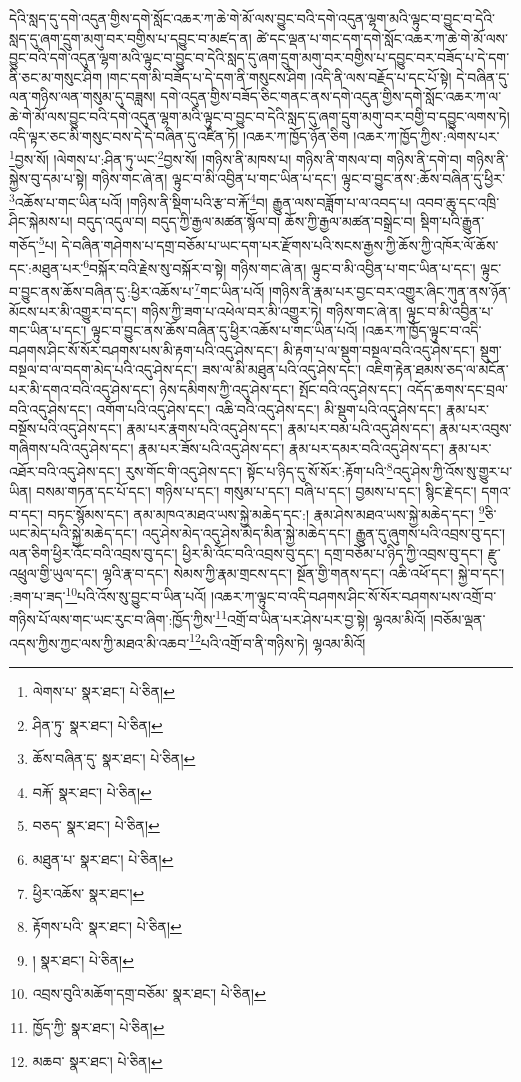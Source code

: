 དེའི་སླད་དུ་དགེ་འདུན་གྱིས་དགེ་སློང་འཆར་ཀ་ཆེ་གེ་མོ་ལས་བྱུང་བའི་དགེ་འདུན་ལྷག་མའི་ལྟུང་བ་བྱུང་བ་དེའི་སླད་དུ་ཞག་དྲུག་མགུ་བར་བགྱིས་པ་དབྱུང་བ་མཛད་ན། ཚེ་དང་ལྡན་པ་གང་དག་དགེ་སློང་འཆར་ཀ་ཆེ་གེ་མོ་ལས་བྱུང་བའི་དགེ་འདུན་ལྷག་མའི་ལྟུང་བ་བྱུང་བ་དེའི་སླད་དུ་ཞག་དྲུག་མགུ་བར་བགྱིས་པ་དབྱུང་བར་བཟོད་པ་དེ་དག་ནི་ཅང་མ་གསུང་ཤིག །གང་དག་མི་བཟོད་པ་དེ་དག་ནི་གསུངས་ཤིག །འདི་ནི་ལས་བརྗོད་པ་དང་པོ་སྟེ། དེ་བཞིན་དུ་ལན་གཉིས་ལན་གསུམ་དུ་བཟླས། དགེ་འདུན་གྱིས་བཟོད་ཅིང་གནང་ནས་དགེ་འདུན་གྱིས་དགེ་སློང་འཆར་ཀ་ལ་ཆེ་གེ་མོ་ལས་བྱུང་བའི་དགེ་འདུན་ལྷག་མའི་ལྟུང་བ་བྱུང་བ་དེའི་སླད་དུ་ཞག་དྲུག་མགུ་བར་བགྱི་བ་དབྱུང་ལགས་ཏེ། འདི་ལྟར་ཅང་མི་གསུང་བས་དེ་དེ་བཞིན་དུ་འཛིན་ཏོ། །འཆར་ཀ་ཁྱོད་ཉོན་ཅིག །འཆར་ཀ་ཁྱོད་ཀྱིས་:ལེགས་པར་\footnote{ལེགས་པ་  སྣར་ཐང་།  པེ་ཅིན། }བྱས་སོ། །ལེགས་པ་:ཤིན་ཏུ་ཡང་\footnote{ཤིན་ཏུ་  སྣར་ཐང་།  པེ་ཅིན། }བྱས་སོ། །གཉིས་ནི་མཁས་པ། གཉིས་ནི་གསལ་བ། གཉིས་ནི་དགེ་བ། གཉིས་ནི་སྐྱེས་བུ་དམ་པ་སྟེ། གཉིས་གང་ཞེ་ན། ལྟུང་བ་མི་འབྱིན་པ་གང་ཡིན་པ་དང་། ལྟུང་བ་བྱུང་ནས་:ཆོས་བཞིན་དུ་ཕྱིར་\footnote{ཆོས་བཞིན་དུ་  སྣར་ཐང་།  པེ་ཅིན། }འཆོས་པ་གང་ཡིན་པའོ། །གཉིས་ནི་སྡིག་པའི་རྩ་བ་རྐོ་\footnote{བརྐོ་  སྣར་ཐང་།  པེ་ཅིན། }བ། རྒྱུན་ལས་བཟློག་པ་ལ་འབད་པ། འབབ་ཆུ་དང་འཁྲི་ཤིང་སྐེམས་པ། བདུད་འདུལ་བ། བདུད་ཀྱི་རྒྱལ་མཚན་སྙོལ་བ། ཆོས་ཀྱི་རྒྱལ་མཚན་བསྒྲེང་བ། སྡིག་པའི་རྒྱུན་གཅོད་\footnote{བཅད་  སྣར་ཐང་།  པེ་ཅིན། }པ། དེ་བཞིན་གཤེགས་པ་དགྲ་བཅོམ་པ་ཡང་དག་པར་རྫོགས་པའི་སངས་རྒྱས་ཀྱི་ཆོས་ཀྱི་འཁོར་ལོ་ཆོས་དང་:མཐུན་པར་\footnote{མཐུན་པ་  སྣར་ཐང་།  པེ་ཅིན། }བསྐོར་བའི་རྗེས་སུ་བསྐོར་བ་སྟེ། གཉིས་གང་ཞེ་ན། ལྟུང་བ་མི་འབྱིན་པ་གང་ཡིན་པ་དང་། ལྟུང་བ་བྱུང་ནས་ཆོས་བཞིན་དུ་:ཕྱིར་འཆོས་པ་\footnote{ཕྱིར་འཆོས་  སྣར་ཐང་། }གང་ཡིན་པའོ། །གཉིས་ནི་རྣམ་པར་བྱང་བར་འགྱུར་ཞིང་ཀུན་ནས་ཉོན་མོངས་པར་མི་འགྱུར་བ་དང་། གཉིས་ཀྱི་ཟག་པ་འཕེལ་བར་མི་འགྱུར་ཏེ། གཉིས་གང་ཞེ་ན། ལྟུང་བ་མི་འབྱིན་པ་གང་ཡིན་པ་དང་། ལྟུང་བ་བྱུང་ནས་ཆོས་བཞིན་དུ་ཕྱིར་འཆོས་པ་གང་ཡིན་པའོ། །འཆར་ཀ་ཁྱོད་ལྟུང་བ་འདི་བཤགས་ཤིང་སོ་སོར་བཤགས་པས་མི་རྟག་པའི་འདུ་ཤེས་དང་། མི་རྟག་པ་ལ་སྡུག་བསྔལ་བའི་འདུ་ཤེས་དང་། སྡུག་བསྔལ་བ་ལ་བདག་མེད་པའི་འདུ་ཤེས་དང་། ཟས་ལ་མི་མཐུན་པའི་འདུ་ཤེས་དང་། འཇིག་རྟེན་ཐམས་ཅད་ལ་མངོན་པར་མི་དགའ་བའི་འདུ་ཤེས་དང་། ཉེས་དམིགས་ཀྱི་འདུ་ཤེས་དང་། སྤོང་བའི་འདུ་ཤེས་དང་། འདོད་ཆགས་དང་བྲལ་བའི་འདུ་ཤེས་དང་། འགོག་པའི་འདུ་ཤེས་དང་། འཆི་བའི་འདུ་ཤེས་དང་། མི་སྡུག་པའི་འདུ་ཤེས་དང་། རྣམ་པར་བསྔོས་པའི་འདུ་ཤེས་དང་། རྣམ་པར་རྣགས་པའི་འདུ་ཤེས་དང་། རྣམ་པར་བམ་པའི་འདུ་ཤེས་དང་། རྣམ་པར་འབུས་གཞིགས་པའི་འདུ་ཤེས་དང་། རྣམ་པར་ཟོས་པའི་འདུ་ཤེས་དང་། རྣམ་པར་དམར་བའི་འདུ་ཤེས་དང་། རྣམ་པར་འཐོར་བའི་འདུ་ཤེས་དང་། རུས་གོང་གི་འདུ་ཤེས་དང་། སྟོང་པ་ཉིད་དུ་སོ་སོར་:རྟོག་པའི་\footnote{རྟོགས་པའི་  སྣར་ཐང་།  པེ་ཅིན། }འདུ་ཤེས་ཀྱི་འོས་སུ་གྱུར་པ་ཡིན། བསམ་གཏན་དང་པོ་དང་། གཉིས་པ་དང་། གསུམ་པ་དང་། བཞི་པ་དང་། བྱམས་པ་དང་། སྙིང་རྗེ་དང་། དགའ་བ་དང་། བཏང་སྙོམས་དང་། ནམ་མཁའ་མཐའ་ཡས་སྐྱེ་མཆེད་དང་:། རྣམ་ཤེས་མཐའ་ཡས་སྐྱེ་མཆེད་དང་། \footnote{།    སྣར་ཐང་།  པེ་ཅིན། }ཅི་ཡང་མེད་པའི་སྐྱེ་མཆེད་དང་། འདུ་ཤེས་མེད་འདུ་ཤེས་མེད་མིན་སྐྱེ་མཆེད་དང་། རྒྱུན་དུ་ཞུགས་པའི་འབྲས་བུ་དང་། ལན་ཅིག་ཕྱིར་འོང་བའི་འབྲས་བུ་དང་། ཕྱིར་མི་འོང་བའི་འབྲས་བུ་དང་། དགྲ་བཅོམ་པ་ཉིད་ཀྱི་འབྲས་བུ་དང་། རྫུ་འཕྲུལ་གྱི་ཡུལ་དང་། ལྷའི་རྣ་བ་དང་། སེམས་ཀྱི་རྣམ་གྲངས་དང་། སྔོན་གྱི་གནས་དང་། འཆི་འཕོ་དང་། སྐྱེ་བ་དང་། :ཟག་པ་ཟད་\footnote{འབྲས་བུའི་མཆོག་དགྲ་བཅོམ་  སྣར་ཐང་།  པེ་ཅིན། }པའི་འོས་སུ་བྱུང་བ་ཡིན་པའོ། །འཆར་ཀ་ལྟུང་བ་འདི་བཤགས་ཤིང་སོ་སོར་བཤགས་པས་འགྲོ་བ་གཉིས་པོ་ལས་གང་ཡང་རུང་བ་ཞིག་:ཁྱོད་ཀྱིས་\footnote{ཁྱོད་ཀྱི་  སྣར་ཐང་།  པེ་ཅིན། }འགྲོ་བ་ཡིན་པར་ཤེས་པར་བྱ་སྟེ། ལྷའམ་མིའོ། །བཅོམ་ལྡན་འདས་ཀྱིས་ཀྱང་ལས་ཀྱི་མཐའ་མི་འཆབ་\footnote{མཆབ་  སྣར་ཐང་།  པེ་ཅིན། }པའི་འགྲོ་བ་ནི་གཉིས་ཏེ། ལྷའམ་མིའོ། 